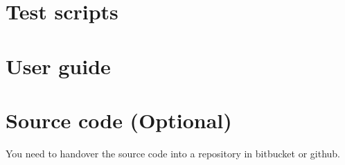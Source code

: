 \documentclass[12pt, a4paper]{report}
\begin{document}
\begin{appendices}
  \chapter{Test scripts} %
  \label{cha:test_scripts}


  \chapter{User guide} %
  \label{cha:user_guide}


  \chapter{Source code (Optional)} %
  \label{cha:source_code}
  You need to handover the source code into a repository in bitbucket or github.
\end{appendices}
\end{document}
